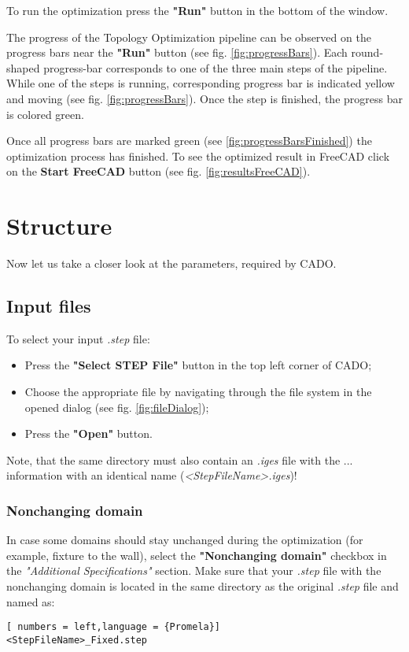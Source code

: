 \documentclass[
12pt, %
a4paper, %
oneside, %
headinclude,footinclude, %
BCOR5mm, %
]{scrartcl}
\begin{document}
To run the optimization press the \textbf{"Run"} button in the bottom of the window.

The progress of the Topology Optimization pipeline can be observed on the progress bars near the \textbf{"Run"} button (see fig. \ref{fig:progressBars}). Each round-shaped progress-bar corresponds to one of the three main steps of the pipeline. While one of the steps is running, corresponding progress bar is indicated yellow and moving (see fig. \ref{fig:progressBars}). Once the step is finished, the progress bar is colored green.

Once all progress bars are marked green (see \ref{fig:progressBarsFinished}) the optimization process has finished. To see the optimized result in FreeCAD click on the \textbf{Start FreeCAD} button (see fig. \ref{fig:resultsFreeCAD}).
\section{Structure}
Now let us take a closer look at the parameters, required by CADO.

\subsection{Input files}
To select your input \textit{.step} file:
\begin{itemize}
\item Press the \textbf{"Select STEP File"} button in the top left corner of CADO;
\item Choose the appropriate file by navigating through the file system in the opened dialog (see fig. \ref{fig:fileDialog});
\item Press the \textbf{"Open"} button.
\end{itemize}

Note, that the same directory must also contain an \textit{.iges} file with the ... information with an identical name (\textit{<StepFileName>.iges})! 

\subsubsection{Nonchanging domain}
In case some domains should stay unchanged during the optimization (for example, fixture to the wall), select the \textbf{"Nonchanging domain"} checkbox in the \textit{"Additional Specifications"} section. Make sure that your \textit{.step} file with the nonchanging domain is located in the same directory as the original \textit{.step} file and named as:
\begin{lstlisting}[ numbers = left,language = {Promela}]
<StepFileName>_Fixed.step
\end{lstlisting}
\end{document}
